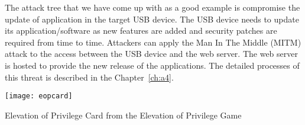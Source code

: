 The attack tree that we have come up with as a good example is compromise the
update of application in the target USB device. The USB device needs to update
its application/software as new features are added and security patches are
required from time to time. Attackers can apply the Man In The Middle (MITM)
attack to the access between the USB device and the web server. The web server
is hosted to provide the new release of the applications. The detailed processes
of this threat is described in the Chapter~\ref{ch:a4}.

\begin{marginfigure}%
\centering
  \texttt{[image: eopcard]}
  \caption{Elevation of Privilege Card from the Elevation of Privilege Game}
  \label{fig:eopcard}
\end{marginfigure}
